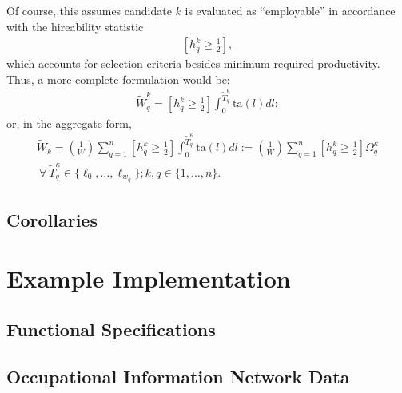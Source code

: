 \documentclass[hidelinks, nonatbib]{elsarticle}
\begin{document}
Of course, this assumes candidate $k$ is evaluated as ``employable'' in accordance with the hireability statistic
\begin{gather}
    \left[
        h_{q}^{k}
        \geq
        \frac{1}{2}
    \right]
    ,
\end{gather}
which accounts for selection criteria besides minimum required productivity. Thus, a more complete formulation would be:
\begin{gather}
    \tilde{W}_{q}^{k}
    =
    \left[
        h_{q}^{k}
        \geq
        \frac{1}{2}
    \right]
    \int_{0}^{\tilde{T}_{q}^{\kappa}}
    \text{ta}(l)
    dl
    ;
\end{gather}
or, in the aggregate form,
\begin{gather}
    \tilde{W}_k 
    = 
    \left(
        \frac{1}{W}
    \right)
    \sum_{q=1}^{n}
    \left[
        h_{q}^{k}
        \geq
        \frac{1}{2}
    \right]
    \int_{0}^{\tilde{T}_{q}^{\kappa}}
    \text{ta}(l)
    dl
    :=
    \left(
        \frac{1}{W}
    \right)
    \sum_{q=1}^{n}
    \left[
        h_{q}^{k}
        \geq
        \frac{1}{2}
    \right]
    \Omega_{q}^{\kappa}
    \\
    \
    \forall
    \
    \tilde{T}_{q}^{\kappa} \in \{
        \ell_{0}, 
        \dots, 
        \ell_{w_q}
    \}
    ;
    k,q \in \{1, \dots, n\}
    .
\end{gather}


\subsection{Corollaries}


\section{Example Implementation}
\subsection{Functional Specifications}
\subsection{Occupational Information Network Data}
\end{document}
